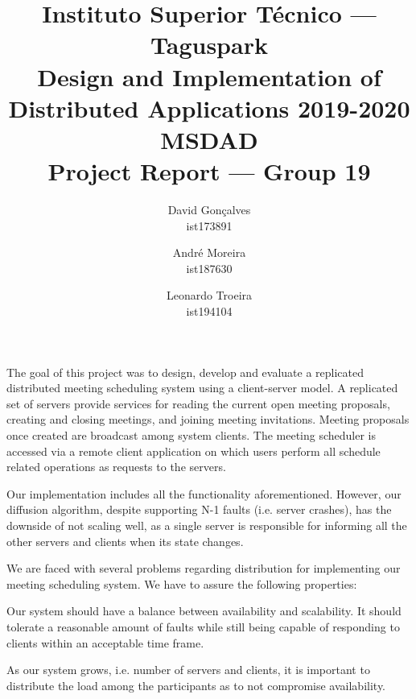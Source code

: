 \documentclass[times, 10pt, twocolumn]{article}
\begin{document}
\title{%
  \normalfont\large Instituto Superior Técnico — Taguspark \\
  \large Design and Implementation of Distributed Applications 2019-2020 \\
  \bigskip
  \bigskip
  \huge MSDAD \\
  \bigskip
  \medskip
  \Large Project Report — Group 19\\
}

\author{
David Gonçalves\\
ist173891
\and
André Moreira\\
ist187630\\
\and
Leonardo Troeira\\
ist194104\\
}

\maketitle
\thispagestyle{empty}

The goal of this project was to design, develop and evaluate a replicated distributed meeting scheduling system using a client-server model. A replicated set of servers provide services for reading the current open meeting proposals, creating and closing meetings, and joining meeting invitations. Meeting proposals once created are broadcast among system clients. The meeting scheduler is accessed via a remote client application on which users perform all schedule related operations as requests to the servers.

Our implementation includes all the functionality aforementioned. However, our diffusion algorithm, despite supporting N-1 faults (i.e. server crashes), has the downside of not scaling well, as a single server is responsible for informing all the other servers and clients when its state changes.

We are faced with several problems regarding distribution for implementing our meeting scheduling system. We have to assure the following properties:

Our system should have a balance between availability and scalability. It should tolerate a reasonable amount of faults while still being capable of responding to clients within an acceptable time frame.

As our system grows, i.e. number of servers and clients, it is important to distribute the load among the participants as to not compromise availability.
\end{document}
